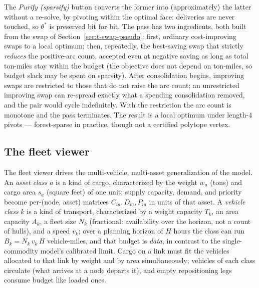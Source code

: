 The \emph{Purify (sparsify)} button converts the former into
(approximately) the latter without a re-solve, by pivoting within the
optimal face: deliveries are never touched, so $\theta^\ast$ is preserved
bit for bit. The pass has two ingredients, both built from the swap of
Section~\ref{sec:t-swap-pseudo}: first, ordinary cost-improving swaps to
a local optimum; then, repeatedly, the best-saving swap that strictly
\emph{reduces} the positive-arc count, accepted even at negative saving
as long as total ton-miles stay within the budget (the objective does not
depend on ton-miles, so budget slack may be spent on sparsity). After
consolidation begins, improving swaps are restricted to those that do not
raise the arc count; an unrestricted improving swap can re-spread exactly
what a spending consolidation removed, and the pair would cycle
indefinitely. With the restriction the arc count is monotone and the pass
terminates. The result is a local optimum under length-4 pivots ---
forest-sparse in practice, though not a certified polytope vertex.

\subsection{The fleet viewer}
\label{sec:t-fleetviewer}

The fleet viewer drives the multi-vehicle, multi-asset generalization of
the model. An \emph{asset class} $a$ is a kind of cargo, characterized by
the weight $w_a$ (tons) and cargo area $s_a$ (square feet) of one unit;
supply capacity, demand, and priority become per-(node, asset) matrices
$C_{ia}, D_{ia}, P_{ia}$ in units of that asset. A \emph{vehicle class}
$k$ is a kind of transport, characterized by a weight capacity $T_k$, an
area capacity $A_k$, a fleet size $N_k$ (fractional: availability over
the horizon, not a count of hulls), and a speed $v_k$; over a planning
horizon of $H$ hours the class can run
$B_k = N_k \, v_k \, H$ vehicle-miles, and that budget is \emph{data},
in contrast to the single-commodity model's calibrated limit. Cargo on a
link must fit the vehicles allocated to that link by weight and by area
simultaneously; vehicles of each class circulate (what arrives at a node
departs it), and empty repositioning legs consume budget like loaded
ones.


